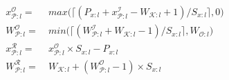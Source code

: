 \begin{align}
\label{eqn:xcoordinate}
x^\mathcal{O}_{\mathcal{P}:l} =&~ max\big(\lceil (P_{x:l} + x^\mathcal{I}_{\mathcal{P}:l} - W_{\mathcal{K}:l} + 1)/S_{x:l} \rceil, 0\big)\\
\label{eqn:patchwidth}
W^\mathcal{O}_{\mathcal{P}:l} =&~ min\big(\lceil (W^\mathcal{I}_{\mathcal{P}:l} + W_{\mathcal{K}:l} - 1)/ S_{x:l} \rceil, W_{\mathcal{O}:l}\big)\\
\label{eqn:xreadcoordinate}
x^\mathcal{R}_{\mathcal{P}:l} =&~ x^\mathcal{O}_{\mathcal{P}:l} \times S_{x:l} - P_{x:l}\\
\label{eqn:readpatchwidth}
W^\mathcal{R}_{\mathcal{P}:l} =&~ W_{\mathcal{K}:l} + (W^\mathcal{O}_{\mathcal{P}:l}-1) \times S_{x:l}
\end{align}





